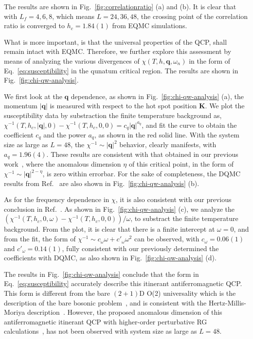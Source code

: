 \documentclass[aps,prx,twocolumn,superscriptaddress,showpacs,floatfix]{revtex4-1}
\begin{document}
The results are shown in Fig.~\ref{fig:correlationratio} (a) and (b). It is clear that with $L_f=4,6,8$, which means $L=24,36,48$, the crossing point of the correlation ratio is converged to $h_c = 1.84(1)$ from EQMC simulations.

What is more important, is that the universal properties of the QCP, shall remain intact with EQMC. Therefore, we further explore this assessment by means of analyzing the various divergences of $\chi(T,h,\mathbf{q},\omega_n)$ in the form of Eq.~\eqref{eq:susceptibility} in the qunatum critical region. The results are shown in Fig.~\ref{fig:chi-qw-analysis}.

We first look at the $\mathbf{q}$ dependence, as shown in Fig.~\ref{fig:chi-qw-analysis} (a), the momentum $|\mathbf{q}|$ is measured with respect to the hot spot position $\mathbf{K}$. We plot the susceptibility data by substraction the finite temperature background as, $\chi^{-1}(T,h_c,|\mathbf{q}|,0)-\chi^{-1}(T,h_c,0,0)=c_q |\mathbf{q}|^{a_q}$, and fit the curve to obtain the coefficient $c_q$ and the power $a_q$, as shown in the red solid line. With the system size as large as $L=48$, the $\chi^{-1}\sim |\mathbf{q}|^2$ behavior, clearly manifests, with $a_q=1.96(4)$. These results are consistent with that obtained in our previous work~\cite{ZHLiu2017}, where the anomalous dimension $\eta$ of this critical point, in the form of $\chi^{-1} \sim |\mathbf{q}|^{2-\eta}$, is zero within errorbar. For the sake of completeness, the DQMC results from Ref.~\cite{ZHLiu2017} are also shown in Fig.~\ref{fig:chi-qw-analysis} (b).

As for the frequency dependence in $\chi$, it is also consistent with our previous conclusion in Ref.~. As shown in Fig.~\ref{fig:chi-qw-analysis} (c), we analyze the $(\chi^{-1}(T,h_c,0,\omega)-\chi^{-1}(T,h_c,0,0))/\omega$, to substract the finite temperature background. From the plot, it is clear that there is a finite intercept at $\omega=0$, and  from the fit, the form of $\chi^{-1} \sim c_\omega \omega + c'_\omega \omega^2$ can be observed, with $c_\omega=0.06(1)$ and $c'_\omega=0.14(1)$, fully consistent with our previously determined the coefficients with DQMC, as also shown in Fig.~\ref{fig:chi-qw-analysis} (d).

The results in Fig.~\ref{fig:chi-qw-analysis} conclude that the form in Eq.~\eqref{eq:susceptibility} accurately describe this itinerant antiferromagnetic QCP. This form is different from the bare $(2+1)$D O(2) universality which is the description of the bare bosonic problem~\cite{Isakov2003,YCWang2017}, and is consistent with the Hertz-Millis-Moriya description~\cite{Hertz1976,Millis1993,Moriya1985}. However, the proposed anomalous dimension of this antiferromagnetic itinerant QCP with higher-order perturbative RG calculations~\cite{Abanov2004}, has not been observed with system size as large as $L=48$.
\end{document}
